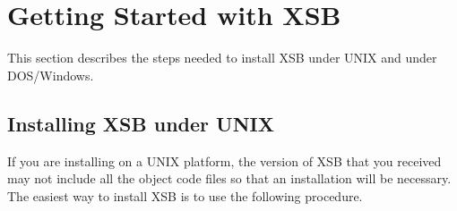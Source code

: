 \chapter{Getting Started with XSB} \label{quick_start}

This section describes the steps needed to install XSB under UNIX and
under DOS/Windows.

\section{Installing XSB under UNIX}
\label{installation_options}

If you are installing on a UNIX platform, the version of XSB that you
received may not include all the object code files so that an
installation will be necessary.  The easiest way to install XSB is to
use the following procedure.

